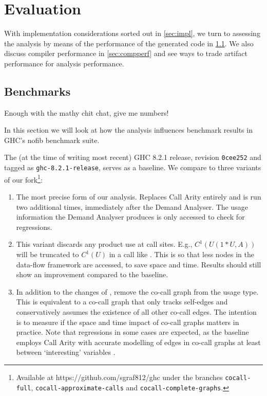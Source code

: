 \chapter{Evaluation}\label{sec:eval}

With implementation considerations sorted out in \cref{sec:impl}, we turn to assessing the analysis by means of the performance of the generated code in \cref{sec:bench}.
We also discuss compiler performance in \cref{sec:compperf} and see ways to trade artifact performance for analysis performance.

\section{Benchmarks}\label{sec:bench}

Enough with the mathy chit chat, give me numbers!

In this section we will look at how the analysis influences benchmark results in GHC's nofib \parencite{nofib} benchmark suite.

The (at the time of writing most recent) GHC 8.2.1 release, revision \texttt{0cee252} and tagged as \texttt{ghc-8.2.1-release}, serves as a baseline. We compare to three variants of our fork\footnote{Available at https://github.com/sgraf812/ghc under the branches \texttt{cocall-full}, \texttt{cocall-approximate-calls} and \texttt{cocall-complete-graphs}.}:

\begin{enumerate}
  \item[\varfull] 
    The most precise form of our analysis. 
    Replaces Call Arity entirely and is run two additional times, immediately after the Demand Analyser. 
    The usage information the Demand Analyser produces is only accessed to check for regressions.
  \item[\varcalls]
    This variant discards any product use at call sites. 
    E.g., $C^1(U(1*U,A))$ will be truncated to $C^1(U)$ in a call like . 
    This is so that less nodes in the data-flow framework are accessed, to save space and time.
    Results should still show an improvement compared to the baseline.
  \item[\varedges]
    In addition to the changes of \varcalls, remove the co-call graph from the usage type. 
    This is equivalent to a co-call graph that only tracks self-edges and conservatively assumes the existence of all other co-call edges.
    The intention is to measure if the space and time impact of co-call graphs matters in practice.
    Note that regressions in some cases are expected, as the baseline employs Call Arity with accurate modelling of edges in co-call graphs at least between `interesting' variables \parencite[section~3.4.1]{callarity}.
\end{enumerate}

